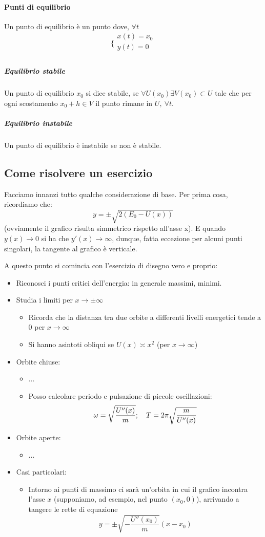 \documentclass[a4paper,12pt]{article}
\begin{document}
\paragraph{Punti di equilibrio}
Un punto di equilibrio è un punto dove, $\forall t$
$$\bigg\{ \begin{array}{l}
x(t) = x_0\\
y(t) = 0\\
\end{array}$$
\subparagraph{Equilibrio stabile}
Un punto di equilibrio $x_0$ si dice stabile, se $\forall U(x_0) \exists V(x_0) \subset U $  tale che per ogni scostamento $x_0 + h \in V$ il punto rimane in $U,\ \forall t$.
\subparagraph{Equilibrio instabile}
Un punto di equilibrio è instabile se non è stabile.

\subsection{Come risolvere un esercizio}
Facciamo innanzi tutto qualche considerazione di base. Per prima cosa, ricordiamo che:
$$y = \pm \sqrt{2(E_0-U(x))}$$
    (ovviamente il grafico risulta simmetrico rispetto all'asse x).
E quando $y(x)\to 0$ si ha che $y'(x) \to \infty$, dunque, fatta eccezione per alcuni punti singolari, la tangente al grafico è verticale.

A questo punto si comincia con l'esercizio di disegno vero e proprio:
\begin{itemize}
 \item Riconosci i punti critici dell'energia: in generale massimi, minimi.
 \item Studia i limiti per $x\to\pm\infty$
 \begin{itemize}
  \item Ricorda che la distanza tra due orbite a differenti livelli energetici tende a $0$ per $x\to\infty$
  \item Si hanno asintoti obliqui se $U(x)\asymp x^2$ (per $x\to\infty$)
 \end{itemize}

 \item Orbite chiuse:
 \begin{itemize}
  \item ...
  \item Posso calcolare periodo e pulsazione di piccole oscillazioni: $$\omega = \sqrt{U''(x)\over m};\ \ \ T = 2\pi\sqrt{m \over U''(x)}$$
 \end{itemize}
 \item Orbite aperte:
 \begin{itemize}
  \item ...
 \end{itemize}
 \item Casi particolari:
 \begin{itemize}
   \item Intorno ai punti di massimo ci sarà un'orbita in cui il grafico incontra l'asse $x$ (supponiamo, ad esempio, nel punto $(x_0, 0)$), arrivando a tangere le rette di equazione $$y = \pm\sqrt{-\dfrac{U''(x_0)}{m}}(x-x_0)$$
 \end{itemize}
\end{itemize}
\end{document}
